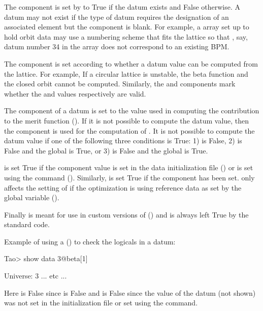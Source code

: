 The  component is set by \tao to True if the datum exists and False otherwise. A datum
may not exist if the type of datum requires the designation of an associated element but the
 component is blank. For example, a  array set up to hold orbit data may
use a numbering scheme that fits the lattice so that , say, datum number 34 in the array does not
correspond to an existing BPM.

The  component is set according to whether a datum value can be computed from the
 lattice. For example, If a circular lattice is unstable, the beta function and the closed
orbit cannot be computed. Similarly, the  and  components mark whether
the  and  values respectively are valid.

The  component of a datum is set to the  value used in computing the
contribution to the merit function (). If it is not possible to compute
the datum value, then the  component is used for the computation of .
It is not possible to compute the datum value if one of the following three conditions is True: 1)
 is False, 2)  is False and the global  is True, or
3)  is False and the global  is True.

 is set True if the  component value is set in the data initialization file
() or is set using the  command (). Similarly, 
is set True if the  component has been set.  only affects the setting of
 if the optimization is using reference data as set by the global variable
 ().

Finally  is meant for use in custom versions of \tao () and is
always left True by the standard \tao code.

Example of using a  () to check the logicals
in a datum:
\begin{example}
  Tao> show data 3@beta[1]

  Universe:   3
      ... etc ...
\end{example}
Here  is False since  is False and  is False since the
 value of the datum (not shown) was not set in the \tao initialization file or set using
the  command.

